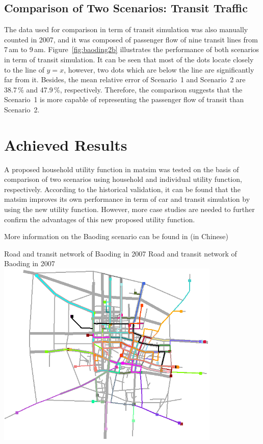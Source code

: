 \subsection{Comparison of Two Scenarios: Transit Traffic}
The data used for comparison in term of transit simulation was also manually counted in 2007, and it was composed of passenger flow of nine transit lines from 7\,am to 9\,am. Figure~\ref{fig:baoding2b} illustrates the performance of both scenarios in term of transit simulation. 
It can be seen that most of the dots locate closely to the line of $y=x$, however, two dots which are below the line are significantly far from it. 
Besides, the mean relative error of Scenario~1 and Scenario~2 are 38.7\,\% and 47.9\,\%, respectively. 
Therefore, the comparison suggests that the Scenario~1 is more capable of representing the passenger flow of transit than Scenario~2. 

\section{Achieved Results}
A proposed household utility function in \gls{matsim} was tested on the basis of comparison of two scenarios using household and individual utility function, respectively. According to the historical validation, it can be found that the \gls{matsim} improves its own performance in term of car and transit simulation by using the new utility function. 
However, more case studies are needed to further confirm the advantages of this new proposed utility function.

More information on the Baoding scenario can be found in \citet[][]{Zhuge_PhDThesis_2014} (in Chinese) 

\createfigure%
{Road and transit network of Baoding in 2007}%
{Road and transit network of Baoding in 2007}%
{\label{fig:baoding_fig1}}%
{\includegraphics[width=0.8\textwidth, angle=0]{scenarios/figures/baoding_fig1.png}}%
{}

